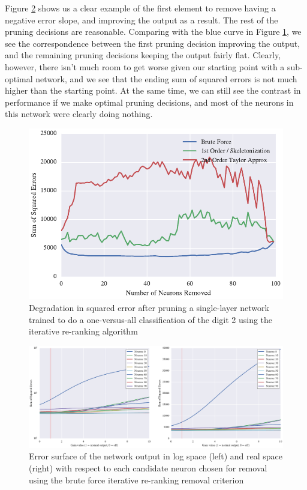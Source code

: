 Figure \ref{fig:mnist-test-single-digit-2-gt} shows us a clear example of the first element to remove having a negative error slope, and improving the output as a result. The rest of the pruning decisions are reasonable. Comparing with the blue curve in Figure \ref{fig:mnist-test-single-digit-2}, we see the correspondence between the first pruning decision improving the output, and the remaining pruning decisions keeping the output fairly flat. Clearly, however, there isn't much room to get worse given our starting point with a sub-optimal network, and we see that the ending sum of squared errors is not much higher than the starting point. At the same time, we can still see the contrast in performance if we make optimal pruning decisions, and most of the neurons in this network were clearly doing nothing. 

\begin{figure}[!ht]
\centering
\includegraphics[width=0.5\linewidth]{png/mnist-test-single-digit-2.pdf}
\caption{Degradation in squared error after pruning a single-layer network trained to do a one-versus-all classification of the digit 2 using the iterative re-ranking algorithm}
\label{fig:mnist-test-single-digit-2}
\end{figure}

\begin{figure}[!ht]
\centering
\includegraphics[width=\linewidth]{png/mnist-test-single-digit-2-gt.pdf}
\caption{Error surface of the network output in log space (left) and real space (right) with respect to each candidate neuron chosen for removal using the brute force iterative re-ranking removal criterion}
\label{fig:mnist-test-single-digit-2-gt}
\end{figure}

